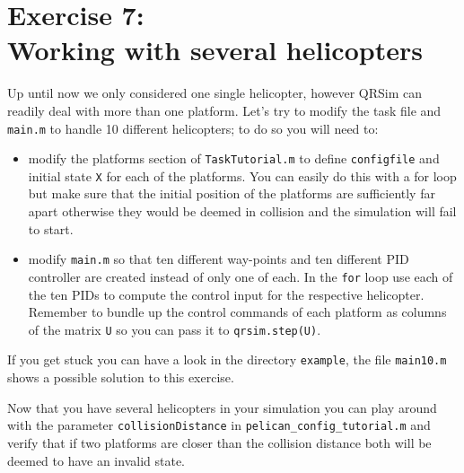 \documentclass[a4paper,11pt]{article}
\begin{document}
\section*{Exercise 7:\\Working with several helicopters}

Up until now we only considered one single helicopter, however QRSim can readily deal with more than one platform.
Let's try to modify the task file and \texttt{main.m} to handle 10 different helicopters; to do so you will need to:
\begin{itemize}
 \item modify the platforms section of \texttt{TaskTutorial.m} to define \texttt{configfile} and initial state \texttt{X} for each of the platforms. You can easily do this with a for loop but make sure that the initial position of the platforms are sufficiently far apart otherwise they would be deemed in collision and the simulation will fail to start.
\item modify \texttt{main.m} so that ten different way-points and ten different PID controller are created instead of only one of each. In the \texttt{for} loop use each of the ten PIDs to compute the control input for the respective helicopter. Remember to bundle up the control commands of each platform as columns of the matrix \texttt{U} so you can pass it to \texttt{qrsim.step(U)}.
\end{itemize}
If you get stuck you can have a look in the directory \texttt{example}, the file \texttt{main10.m} shows a possible solution to this exercise.

Now that you have several helicopters in your simulation you can play around with the parameter \texttt{collisionDistance} in \texttt{pelican\_config\_tutorial.m} and verify that if two platforms are closer than the collision distance both will be deemed to have an invalid state.
\end{document}
